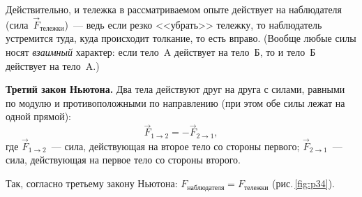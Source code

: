 \documentclass[main.tex]{subfiles}
\begin{document}
Действительно, и тележка в рассматриваемом опыте действует на наблюдателя (сила~$\vec F_\text{тележки}$)~--- ведь если резко <<убрать>> тележку, то наблюдатель устремится туда, куда происходит толкание, то есть вправо. (Вообще любые силы носят \emph{взаимный} характер: если тело~A действует на тело~Б, то и тело~Б действует на тело~A.) 

\begin{law}
\textbf{Третий закон Ньютона.} Два тела действуют друг на друга с силами, равными по модулю
и противоположными по направлению (при этом обе силы лежат на одной прямой):
\begin{equation}
    \vec F_{1\to2}=-\vec F_{2\to1},
\end{equation}
где $\vec F_{1\to2}$~--- сила, действующая на второе тело со стороны первого; $\vec F_{2\to1}$~--- сила, действующая на первое тело со стороны второго.
\end{law}

Так, согласно третьему закону Ньютона: $F_\text{наблюдателя}= F_\text{тележки}$ (рис.\,\ref{fig:p34}). 







 
\end{document}
